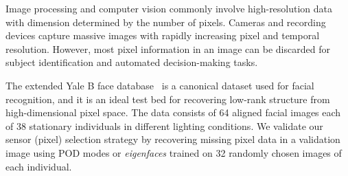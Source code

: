 \documentclass[letterpaper]{IEEEtran}
\begin{document}
Image processing and computer vision commonly involve high-resolution data with dimension determined by the number of pixels. Cameras and recording devices capture massive images with rapidly increasing pixel and temporal resolution. However, most pixel information in an image can be discarded for subject identification and automated decision-making tasks. 

The extended Yale B face database~\cite{YaleB2001ieee,YaleB2005ieee} is a canonical dataset used for facial recognition, and it is an ideal test bed for recovering low-rank structure from high-dimensional pixel space. 
The data consists of 64 aligned facial images each of 38 stationary individuals in different lighting conditions. 
We validate our sensor (pixel) selection strategy by recovering missing pixel data in a validation image using POD modes or {\em eigenfaces} trained on 32 randomly chosen images of each individual.
\end{document}
